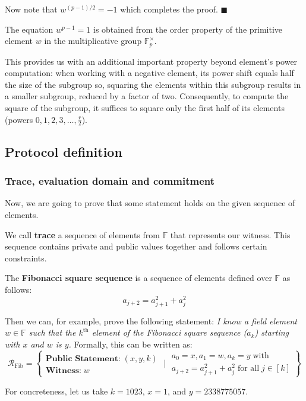 \documentclass[../lecture-notes.tex]{subfiles}
\begin{document}
Now note that $w^{(p-1)/2} = -1$ which completes the proof. $\blacksquare$

\begin{remark}
The equation $w^{p - 1} = 1$ is obtained from the order property of the
primitive element $w$ in the multiplicative group $\mathbb{F}^{\times}_p$. 
\end{remark}
\begin{remark}
This provides us with an additional important property beyond element's power
computation: when working with a negative element, its power shift equals half
the size of the subgroup so, squaring the elements within this subgroup results
in a smaller subgroup, reduced by a factor of two. Consequently, to compute the
square of the subgroup, it suffices to square only the first half of its
elements (powers $0, 1, 2, 3, \dots, \frac{r}{2}$).
\end{remark}

\subsection{Protocol definition}

\subsubsection{Trace, evaluation domain and commitment}
Now, we are going to prove that some statement holds on the given sequence of elements.

\begin{definition}
We call \textbf{trace} a sequence of elements from $\mathbb{F}$ that represents our witness. This sequence contains private and public values together and follows certain constraints.
\end{definition}

\begin{example}
The \textbf{Fibonacci square sequence} is a sequence of elements defined over
$\mathbb{F}$ as follows: 
\begin{equation*}
a_{j+2} = a_{j+1}^2 + a_{j}^2  
\end{equation*}

Then we can, for example, prove the following statement: \textcolor{blue!60!black}{\textit{I know a field
element $w \in \mathbb{F}$ such that the $k^{\text{th}}$ element of the Fibonacci
square sequence ($a_k$) starting with $x$ and $w$ is $y$.}} Formally,
this can be written as:
\begin{equation*}
    \mathcal{R}_{\text{Fib}} = \left\{ \begin{matrix}
        \textbf{Public Statement:} \; (x, y, k) \\
        \textbf{Witness:} \; w  
    \end{matrix} \;\Big|\;  \begin{matrix}
        a_0 = x, a_1 = w, a_k = y \; \text{with} \\ a_{j+2} = a_{j+1}^2 + a_j^2 \; \text{for all} \; j \in [k] 
    \end{matrix}    
    \right\}
\end{equation*} 

For concreteness, let us take $k=1023$, $x = 1$, and $y=2338775057$.
\end{example}
\end{document}
